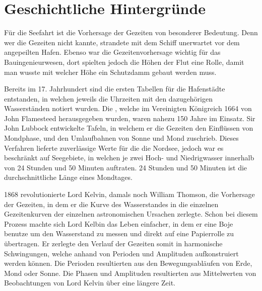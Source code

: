 %
%
%
%
\section{Geschichtliche Hintergründe\label{gezeiten:section:Geschichtliche Hintergründe}}
Für die Seefahrt ist die Vorhersage der Gezeiten von besonderer Bedeutung.
Denn wer die Gezeiten nicht kannte, strandete mit dem Schiff unerwartet vor dem angepeilten Hafen.
Ebenso war die Gezeitenvorhersage wichtig für das Bauingenieurwesen, dort spielten jedoch die Höhen der Flut eine Rolle, damit man wusste mit welcher Höhe ein Schutzdamm gebaut werden muss.

Bereits im 17. Jahrhundert sind die ersten Tabellen für die Hafenstädte entstanden,
in welchen jeweils die Uhrzeiten mit den dazugehörigen Wasserständen notiert wurden.
Die \grqq, welche im Vereinigten Königreich 1664 von John Flamesteed
herausgegeben wurden, waren nahezu 150 Jahre im Einsatz.
Sir John Lubbock entwickelte Tafeln, 
in welchem er die Gezeiten den Einflüssen von Mondphase, und den Umlaufbahnen von
Sonne und Mond zuschrieb. Dieses Verfahren lieferte zuverlässige Werte für die
die Nordsee, jedoch war es beschränkt auf Seegebiete, in welchen je zwei Hoch- und Niedrigwasser innerhalb von 24 Stunden und 50 Minuten auftraten. 24 Stunden und 50 Minuten ist die durchschnittliche Länge eines Mondtages.

1868 revolutionierte Lord Kelvin, damals noch William Thomson, die Vorhersage der Gezeiten, in dem er die Kurve des Wasserstandes in die einzelnen Gezeitenkurven der einzelnen astronomischen Ursachen zerlegte.
Schon bei diesem Prozess machte sich Lord Kelbin das Leben einfacher, in dem er eine Boje benutze um den Wasserstand zu messen und direkt auf eine Papierrolle zu übertragen.
Er zerlegte den Verlauf der Gezeiten somit in harmonische Schwingungen, welche anhand von Perioden und Amplituden aufkonstruiert werden können.
Die Perioden resultierten aus den Bewegungsabläufen von Erde, Mond oder Sonne.
Die Phasen und Amplituden resultierten aus Mittelwerten von Beobachtungen von Lord Kelvin über eine längere Zeit.




